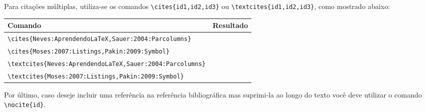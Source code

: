 Para citações múltiplas, utiliza-se os comandos \lstinline+\cites{id1,id2,id3}+
ou \lstinline+\textcites{id1,id2,id3}+, como mostrado abaixo:
\begin{table}[!h]
  \centering
  \begin{tabular}{lc}
    \hline
    Comando & Resultado \\ \hline
    \lstinline+\cites{Neves:AprendendoLaTeX,Sauer:2004:Parcolumns}+ & \cites{Neves:AprendendoLaTeX,Sauer:2004:Parcolumns} \\
    \lstinline+\cites{Moses:2007:Listings,Pakin:2009:Symbol}+ & \cites{Moses:2007:Listings,Pakin:2009:Symbol} \\
    \lstinline+\textcites{Neves:AprendendoLaTeX,Sauer:2004:Parcolumns}+ & \textcites{Neves:AprendendoLaTeX,Sauer:2004:Parcolumns} \\
    \lstinline+\textcites{Moses:2007:Listings,Pakin:2009:Symbol}+ & \textcites{Moses:2007:Listings,Pakin:2009:Symbol} \\ \hline
  \end{tabular}
\end{table}

Por último, caso deseje incluir uma referência na referência bibliográfica mas
suprimi-la ao longo do texto você deve utilizar o comando
\lstinline+\nocite{id}+.
